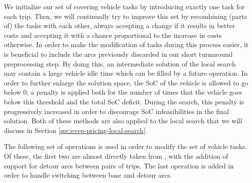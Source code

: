 \documentclass[]{article}
\begin{document}
We initialize our set of covering vehicle tasks by introducing exactly one task for each trip. Then, we will continually try to improve this set by recombining (parts of) the tasks with each other, always accepting a change if it results in better costs and accepting it with a chance proportional to the increase in costs otherwise. In order to make the modification of tasks during this process easier, it is beneficial to include the arcs previously discarded in our short turnaround preprocessing step. By doing this, an intermediate solution of the local search may contain a large vehicle idle time which can be filled by a future operation. In order to further enlarge the solution space, the SoC of the vehicle is allowed to go below 0; a penalty is applied both for the number of times that the vehicle goes below this threshold and the total SoC deficit. During the search, this penalty is progressively increased in order to discourage SoC infeasibilities in the final solution. Both of these methods are also applied to the local search that we will discuss in Section \ref{sec:evsp-pricing-local-search}.

The following set of operations is used in order to modify the set of vehicle tasks. Of these, the first two are almost directly taken from \citet{Bosch21}, with the addition of support for detour arcs between pairs of trips. The last operation is added in order to handle switching between base and detour arcs.
\end{document}
